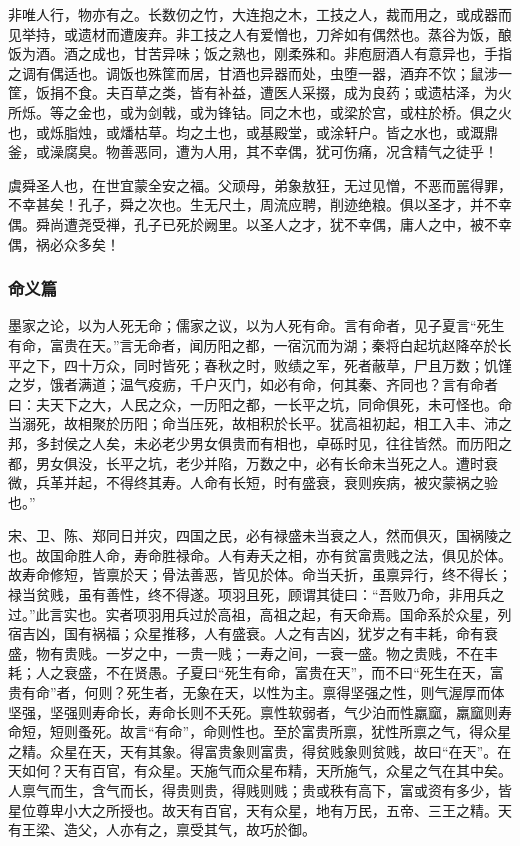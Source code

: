 \documentclass[]{article}
\begin{document}
非唯人行，物亦有之。长数仞之竹，大连抱之木，工技之人，裁而用之，或成器而见举持，或遗材而遭废弃。非工技之人有爱憎也，刀斧如有偶然也。蒸谷为饭，酿饭为酒。酒之成也，甘苦异味；饭之熟也，刚柔殊和。非庖厨酒人有意异也，手指之调有偶适也。调饭也殊筐而居，甘酒也异器而处，虫堕一器，酒弃不饮；鼠涉一筐，饭捐不食。夫百草之类，皆有补益，遭医人采掇，成为良药；或遗枯泽，为火所烁。等之金也，或为剑戟，或为锋钴。同之木也，或梁於宫，或柱於桥。俱之火也，或烁脂烛，或燔枯草。均之土也，或基殿堂，或涂轩户。皆之水也，或溉鼎釜，或澡腐臭。物善恶同，遭为人用，其不幸偶，犹可伤痛，况含精气之徒乎！

虞舜圣人也，在世宜蒙全安之福。父顽母，弟象敖狂，无过见憎，不恶而嚚得罪，不幸甚矣！孔子，舜之次也。生无尺土，周流应聘，削迹绝粮。俱以圣才，并不幸偶。舜尚遭尧受禅，孔子已死於阙里。以圣人之才，犹不幸偶，庸人之中，被不幸偶，祸必众多矣！

\hypertarget{header-n61}{%
\subsubsection{命义篇}\label{header-n61}}

墨家之论，以为人死无命；儒家之议，以为人死有命。言有命者，见子夏言``死生有命，富贵在天。''言无命者，闻历阳之都，一宿沉而为湖；秦将白起坑赵降卒於长平之下，四十万众，同时皆死；春秋之时，败绩之军，死者蔽草，尸且万数；饥馑之岁，饿者满道；温气疫疬，千户灭门，如必有命，何其秦、齐同也？言有命者曰：夫天下之大，人民之众，一历阳之都，一长平之坑，同命俱死，未可怪也。命当溺死，故相聚於历阳；命当压死，故相积於长平。犹高祖初起，相工入丰、沛之邦，多封侯之人矣，未必老少男女俱贵而有相也，卓砾时见，往往皆然。而历阳之都，男女俱没，长平之坑，老少并陷，万数之中，必有长命未当死之人。遭时衰微，兵革并起，不得终其寿。人命有长短，时有盛衰，衰则疾病，被灾蒙祸之验也。''

宋、卫、陈、郑同日并灾，四国之民，必有禄盛未当衰之人，然而俱灭，国祸陵之也。故国命胜人命，寿命胜禄命。人有寿夭之相，亦有贫富贵贱之法，俱见於体。故寿命修短，皆禀於天；骨法善恶，皆见於体。命当夭折，虽禀异行，终不得长；禄当贫贱，虽有善性，终不得遂。项羽且死，顾谓其徒曰：``吾败乃命，非用兵之过。''此言实也。实者项羽用兵过於高祖，高祖之起，有天命焉。国命系於众星，列宿吉凶，国有祸福；众星推移，人有盛衰。人之有吉凶，犹岁之有丰耗，命有衰盛，物有贵贱。一岁之中，一贵一贱；一寿之间，一衰一盛。物之贵贱，不在丰耗；人之衰盛，不在贤愚。子夏曰``死生有命，富贵在天''，而不曰``死生在天，富贵有命''者，何则？死生者，无象在天，以性为主。禀得坚强之性，则气渥厚而体坚强，坚强则寿命长，寿命长则不夭死。禀性软弱者，气少泊而性羸窳，羸窳则寿命短，短则蚤死。故言``有命''，命则性也。至於富贵所禀，犹性所禀之气，得众星之精。众星在天，天有其象。得富贵象则富贵，得贫贱象则贫贱，故曰``在天''。在天如何？天有百官，有众星。天施气而众星布精，天所施气，众星之气在其中矣。人禀气而生，含气而长，得贵则贵，得贱则贱；贵或秩有高下，富或资有多少，皆星位尊卑小大之所授也。故天有百官，天有众星，地有万民，五帝、三王之精。天有王梁、造父，人亦有之，禀受其气，故巧於御。
\end{document}
